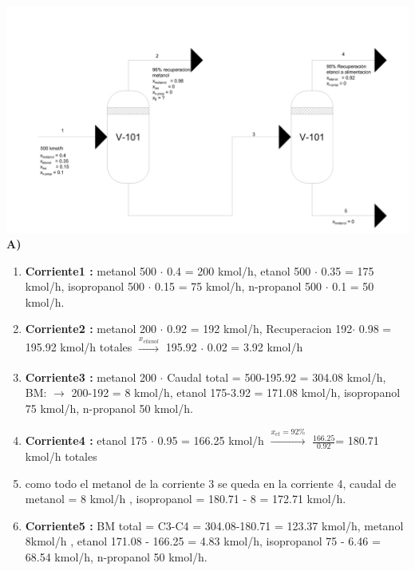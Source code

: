 \documentclass{report}
\begin{document}
\begin{raggedright}
	\includegraphics[width=1\textwidth]{problema1.jpg}\\
\textbf{A)}\\
\vspace{1\baselineskip}
\begin{enumerate}
	\item [] \textbf{Corriente1 :} metanol 500 $\cdot $ 0.4 = 200 kmol/h, etanol 500 $\cdot $ 0.35 = 175 kmol/h, isopropanol 500 $\cdot $ 0.15 = 75 kmol/h, n-propanol 500 $\cdot $ 0.1 = 50 kmol/h.\\
	\item [] \textbf{Corriente2 :} metanol 200 $\cdot $ 0.92 = 192 kmol/h, Recuperacion 192$\cdot$ 0.98 = 195.92 kmol/h totales $\xrightarrow[]{x_{etanol}}$ 195.92 $\cdot$ 0.02 = 3.92 kmol/h \\
	\item [] \textbf{Corriente3 :} metanol 200 $\cdot $ Caudal total = 500-195.92 = 304.08 kmol/h, BM: $\rightarrow$ 200-192 = 8 kmol/h, etanol 175-3.92 = 171.08 kmol/h, isopropanol 75 kmol/h, n-propanol 50 kmol/h.\\
	\item [] \textbf{Corriente4 :} etanol 175 $\cdot$ 0.95 = 166.25 kmol/h $\xrightarrow{x_{et}=92\%}$ $\frac{166.25}{0.92}$= 180.71 kmol/h totales
	\item [] como todo  el metanol de la corriente 3 se queda en la corriente 4, caudal de metanol = 8 kmol/h , isopropanol = 180.71 - 8 = 172.71 kmol/h.\\
	\item [] \textbf{Corriente5 :} BM total = C3-C4 = 304.08-180.71 = 123.37 kmol/h, metanol 8kmol/h , etanol 171.08 - 166.25 = 4.83 kmol/h, isopropanol 75 - 6.46 = 68.54 kmol/h, n-propanol 50 kmol/h.
\end{enumerate}
\end{raggedright}
\end{document}
